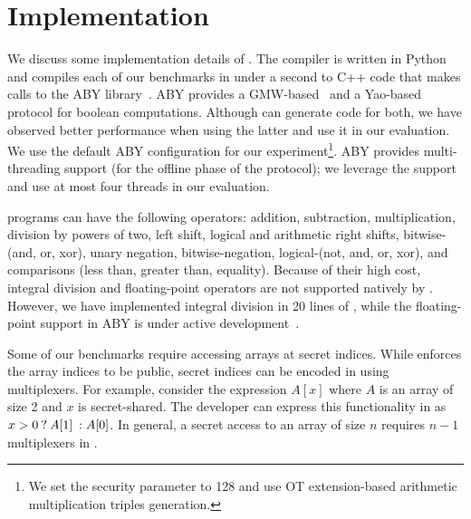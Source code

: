 \section{Implementation}
\label{sec:impl}
We discuss some  implementation details of \tool.
The  \tool compiler is written in Python and
compiles each of our benchmarks in under a second to C++ code that
makes calls to the ABY
library~\cite{aby}. 
ABY provides a GMW-based~\cite{gmw} and a  Yao-based~\cite{yao} protocol for boolean computations.
Although \tool can generate code for both, we have observed better performance when using the latter
and use it in our evaluation.
We use the default ABY configuration for our
experiment\footnote{We set the security parameter to 128 and use OT
extension-based arithmetic multiplication triples generation.}. ABY
provides multi-threading support (for the offline phase of the \mpc
protocol); we leverage the support and use at most four threads in our
evaluation. 

\tool programs can have the following operators:
addition, subtraction, multiplication, division by powers of two, left
shift,
logical and arithmetic right shifts, bitwise-(and, or, xor), unary
negation, 
bitwise-negation, logical-(not, and, or, xor), and comparisons (less
than, greater than, equality).  
Because of their high cost, integral division and floating-point
operators are not supported natively by \tool. 
However, we have implemented integral division in 20 lines of \tool,
while the floating-point support in ABY is under active
development~\cite{ddkssz15}.

Some of our benchmarks require accessing arrays at secret
indices. While \tool enforces the array indices to be
public, secret indices can be encoded in \tool using multiplexers.
For example, consider the expression $A[x]$ where $A$ is an array of
size 2 and $x$ is secret-shared. The developer can express
this functionality in \tool as ${{x > 0}\:?\:{A[1]}\::{A[0]}}$. In general,
a secret access to an array of
size $n$ requires ${n}-1$ multiplexers in \tool.


